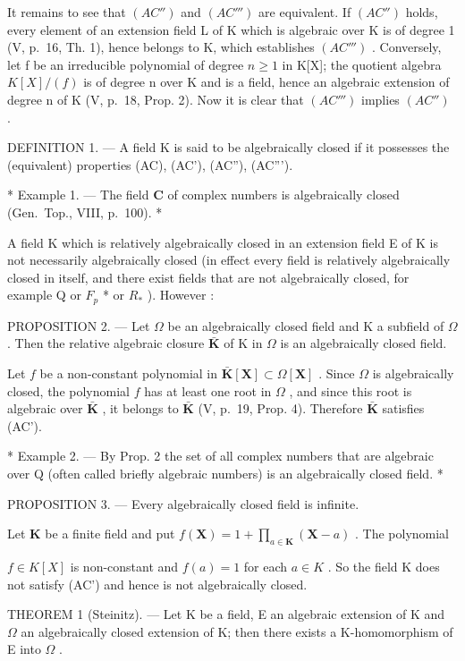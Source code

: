 It remains to see that \((AC'')\) and \((AC''')\) are equivalent. If \((AC'')\) holds, every element of an extension field L of K which is algebraic over K is of degree 1 (V, p.~16, Th. 1), hence belongs to K, which establishes \((AC''')\) . Conversely, let f be an irreducible polynomial of degree \(n \geqslant 1\) in K{[}X{]}; the quotient algebra \(K[X]/(f)\) is of degree n over K and is a field, hence an algebraic extension of degree n of K (V, p.~18, Prop. 2). Now it is clear that \((AC''')\) implies \((AC'')\) .

DEFINITION 1. --- A field K is said to be algebraically closed if it possesses the (equivalent) properties (AC), (AC'), (AC''), (AC''').

* Example 1. --- The field \(\mathbf{C}\) of complex numbers is algebraically closed (Gen.~Top., VIII, p.~100). *

A field K which is relatively algebraically closed in an extension field E of K is not necessarily algebraically closed (in effect every field is relatively algebraically closed in itself, and there exist fields that are not algebraically closed, for example Q or \(F_{p}\) * or \(R_{*}\) ). However :

PROPOSITION 2. --- Let \(\Omega\) be an algebraically closed field and K a subfield of \(\Omega\) . Then the relative algebraic closure \(\bar{\mathbf{K}}\) of K in \(\Omega\) is an algebraically closed field.

Let \(f\) be a non-constant polynomial in \(\bar{\mathbf{K}}[\mathbf{X}] \subset \Omega[\mathbf{X}]\) . Since \(\Omega\) is algebraically closed, the polynomial \(f\) has at least one root in \(\Omega\) , and since this root is algebraic over \(\bar{\mathbf{K}}\) , it belongs to \(\bar{\mathbf{K}}\) (V, p.~19, Prop. 4). Therefore \(\bar{\mathbf{K}}\) satisfies (AC').

* Example 2. --- By Prop. 2 the set of all complex numbers that are algebraic over Q (often called briefly algebraic numbers) is an algebraically closed field. *

PROPOSITION 3. --- Every algebraically closed field is infinite.

Let \(\mathbf{K}\) be a finite field and put \(f(\mathbf{X}) = 1 + \prod_{a\in \mathbf{K}}(\mathbf{X} - a)\) . The polynomial

\(f \in K[X]\) is non-constant and \(f(a) = 1\) for each \(a \in K\) . So the field K does not satisfy (AC') and hence is not algebraically closed.

THEOREM 1 (Steinitz). --- Let K be a field, E an algebraic extension of K and \(\Omega\) an algebraically closed extension of K; then there exists a K-homomorphism of E into \(\Omega\) .

